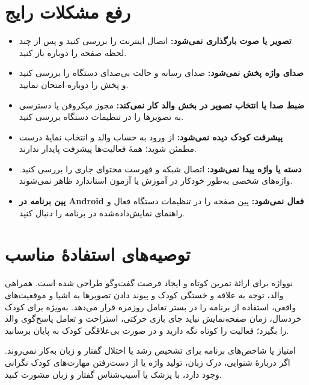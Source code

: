 \section{رفع مشکلات رایج}

\begin{itemize}
\item \textbf{تصویر یا صوت بارگذاری نمی‌شود:} اتصال اینترنت را بررسی کنید و پس از چند لحظه صفحه را دوباره باز کنید.
\item \textbf{صدای واژه پخش نمی‌شود:} صدای رسانه و حالت بی‌صدای دستگاه را بررسی کنید و پخش را دوباره امتحان نمایید.
\item \textbf{ضبط صدا یا انتخاب تصویر در بخش والد کار نمی‌کند:} مجوز میکروفن یا دسترسی به تصویرها را در تنظیمات دستگاه بررسی کنید.
\item \textbf{پیشرفت کودک دیده نمی‌شود:} از ورود به حساب والد و انتخاب نمایهٔ درست مطمئن شوید؛ همهٔ فعالیت‌ها پیشرفت پایدار ندارند.
\item \textbf{دسته یا واژه پیدا نمی‌شود:} اتصال شبکه و فهرست محتوای جاری را بررسی کنید. واژه‌های شخصی به‌طور خودکار در آموزش یا آزمون استاندارد ظاهر نمی‌شوند.
\item \textbf{پین برنامه در Android فعال نمی‌شود:} پین صفحه را در تنظیمات دستگاه فعال و راهنمای نمایش‌داده‌شده در برنامه را دنبال کنید.
\end{itemize}

\section{توصیه‌های استفادهٔ مناسب}

نوواژه برای ارائهٔ تمرین کوتاه و ایجاد فرصت گفت‌وگو طراحی شده است. همراهی والد، توجه به علاقه و خستگی کودک و پیوند دادن تصویرها به اشیا و موقعیت‌های واقعی، استفاده از برنامه را در بستر تعامل روزمره قرار می‌دهد. به‌ویژه برای کودک خردسال، زمان صفحه‌نمایش نباید جای بازی حرکتی، استراحت و تعامل پاسخ‌گوی والد را بگیرد؛ فعالیت را کوتاه نگه دارید و در صورت بی‌علاقگی کودک به پایان برسانید.

امتیاز یا شاخص‌های برنامه برای تشخیص رشد یا اختلال گفتار و زبان به‌کار نمی‌روند. اگر دربارهٔ شنوایی، درک زبان، تولید واژه یا از دست‌رفتن مهارت‌های کودک نگرانی وجود دارد، با پزشک یا آسیب‌شناس گفتار و زبان مشورت کنید.
